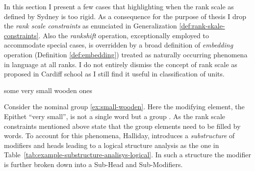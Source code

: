 
In this section I present a few cases that highlighting when the rank scale as defined by Sydney is too rigid. As a consequence for the purpose of thesis I drop the \textit{rank scale constraints} as enunciated in Generalization \ref{def:rank-skale-constraints}. Also the \textit{rankshift} operation, exceptionally employed to accommodate special cases, is overridden by a broad definition of \textit{embedding}  operation (Definition \ref{def:embedding}) treated as naturally occurring phenomena in language at all ranks. I do not entirely dismiss the concept of rank scale as proposed in Cardiff school as I still find it useful in classification of units.


\begin{exe}
    \ex \label{ex:small-wooden} some very small wooden ones
\end{exe}

Consider the nominal group \ref{ex:small-wooden}. Here the modifying element, the Epithet ``very small'', is not a single word but a group \citep[390--396]{Halliday2013}. As the rank scale constraints mentioned above state that the group elements need to be filled by words. To account for this phenomena, Halliday, introduces a \textit{substructure} of modifiers and heads leading to a logical structure analysis as the one in \mbox{Table \ref{tab:example-substructure-analisys-logical}}. In such a structure the modifier is further broken down into a Sub-Head and Sub-Modifiers. 


